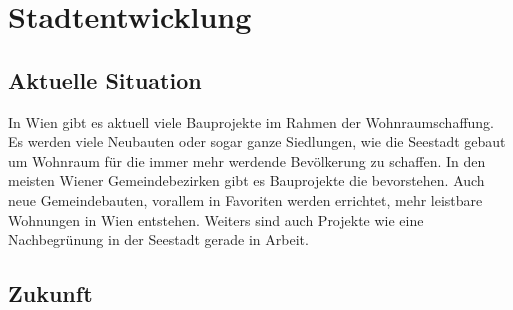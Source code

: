 \section{Stadtentwicklung}

\subsection{Aktuelle Situation}

In Wien gibt es aktuell viele Bauprojekte im Rahmen der Wohnraumschaffung. Es werden viele Neubauten oder sogar ganze Siedlungen, wie die Seestadt gebaut um Wohnraum für die immer mehr werdende Bevölkerung zu schaffen. In den meisten Wiener Gemeindebezirken gibt es Bauprojekte die bevorstehen. Auch neue Gemeindebauten, vorallem in Favoriten werden errichtet, mehr leistbare Wohnungen in Wien entstehen. Weiters sind auch Projekte wie eine Nachbegrünung in der Seestadt gerade in Arbeit.

\subsection{Zukunft}